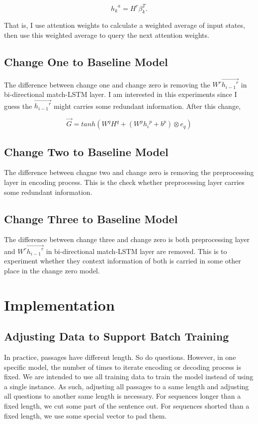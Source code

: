 \documentclass[modernstyle,12pt]{sjsuthesis}
\theoremstyle{definition}
\begin{document}
$${h_k}^a = H^r\beta _{k}^T.$$

That is, I use attention weights to calculate a weighted average of input states, then use this weighted average to query the next attention weights.

\section{Change One to Baseline Model}

The difference between change one and change zero is removing the $W^r\overrightarrow{{h_{i-1}}^r}$ in bi-directional match-LSTM layer. I am interested in this experiments since I guess the $\overrightarrow{{h_{i-1}}^r}$ might carries some redundant information. After this change,


$$\overrightarrow{G} = tanh(W^qH^q + (W^p{h_i}^p + b^p) \otimes e_q)$$


\section{Change Two to Baseline Model}

The difference between chagne two and change zero is removing the preprocessing layer in encoding process. This is the check whether preprocessing layer carries some redundant information.

\section{Change Three to Baseline Model}

The difference between change three and change zero is both preprocessing layer and $W^r\overrightarrow{{h_{i-1}}^r}$ in bi-directional match-LSTM layer are removed. This is to experiment whether they context information of both is carried in some other place in the change zero model.

\chapter{Implementation}

\section{Adjusting Data to Support Batch Training}\label{sect:padding}

In practice, passages have different length. So do questions. However, in one specific model, the number of times to iterate encoding or decoding process is fixed. We are intended to use all training data to train the model instead of using a single instance. As such, adjusting all passages to a same length and adjusting all questions to another same length is necessary. For sequences longer than a fixed length, we cut some part of the sentence out. For sequences shorted than a fixed length, we use some special vector to pad them.
\end{document}
